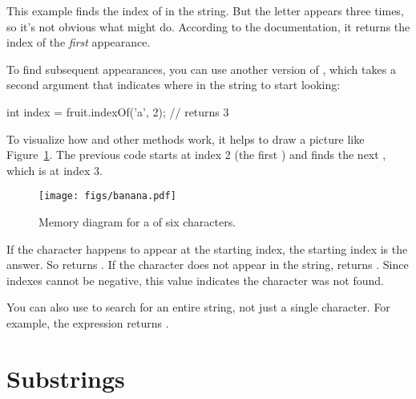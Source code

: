 This example finds the index of  in the string.
But the letter appears three times, so it's not obvious what  might do.
According to the documentation, it returns the index of the {\em first} appearance.

To find subsequent appearances, you can use another version of , which takes a second argument that indicates where in the string to start looking:

\begin{code}
int index = fruit.indexOf('a', 2);  // returns 3
\end{code}

To visualize how  and other  methods work, it helps to draw a picture like Figure~\ref{fig.banana}.
The previous code starts at index 2 (the first ) and finds the next , which is at index 3.


\begin{figure}[!ht]
\begin{center}
\texttt{[image: figs/banana.pdf]}
\caption{Memory diagram for a  of six characters.}
\label{fig.banana}
\end{center}
\end{figure}


If the character happens to appear at the starting index, the starting index is the answer.
So  returns .
If the character does not appear in the string,  returns .
Since indexes cannot be negative, this value indicates the character was not found.

You can also use  to search for an entire string, not just a single character.
For example, the expression  returns .


\section{Substrings}

